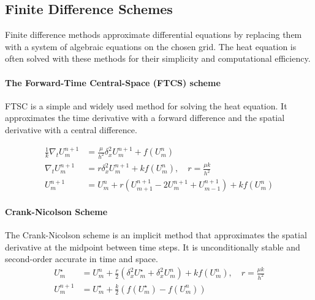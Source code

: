 \subsection{Finite Difference Schemes}
Finite difference methods approximate differential equations by replacing them with a system of algebraic equations on the chosen grid.
The heat equation is often solved with these methods for their simplicity and computational efficiency.

\paragraph{The Forward-Time Central-Space (FTCS) scheme}
FTSC is a simple and widely used method for solving the heat equation.
It approximates the time derivative with a forward difference and the spatial derivative with a central difference.

\begin{align*}
  \frac{1}{k} \nabla_t U_m^{n+1} & = \frac{\mu}{h^2} \delta_x^2 U_m^{n+1} + f(U_m^n)                                              \\
  \nabla_t U_m^{n+1}             & = r \delta_x^2 U_m^{n+1} + k f(U_m^n), \quad r = \frac{\mu k}{h^2}                             \\
  U_m^{n+1}                      & = U_m^n + r \left( U_{m+1}^{n+1} - 2 U_m^{n+1} + U_{m-1}^{n+1} \right) + k f(U_m^n) \tag{FTCS}
\end{align*}

\paragraph{Crank-Nicolson Scheme}

The Crank-Nicolson scheme is an implicit method that approximates the spatial derivative at the midpoint between time steps. It is unconditionally stable and second-order accurate in time and space.
\begin{align*}
  U_m^\star & = U_m^n + \frac{r}{2} \left( \delta_x^2 U_m^\star + \delta_x^2 U_m^n \right) + k f(U_m^n), \quad r = \frac{\mu k}{h^2} \tag{Crank-Nicolson} \\
  U_m^{n+1} & = U_m^\star + \frac{k}{2} \left( f(U_m^\star) - f(U_m^n) \right)
\end{align*}


